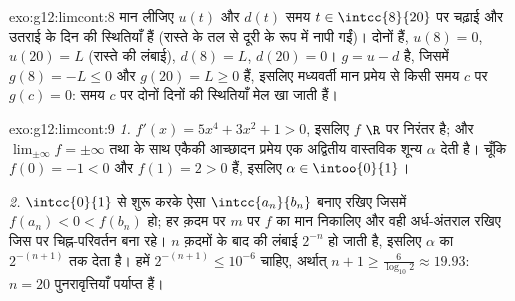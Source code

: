 \begin{solution}{exo:g12:limcont:8}
मान लीजिए $u(t)$ और $d(t)$ समय $t \in \intcc{8}{20}$ पर चढ़ाई और उतराई के दिन की स्थितियाँ हैं
(रास्ते के तल से दूरी के रूप में नापी गईं)। दोनों  हैं, $u(8) = 0$, $u(20) = L$
(रास्ते की लंबाई), $d(8) = L$, $d(20) = 0$।  $g = u - d$  है, जिसमें $g(8) = -L \leq 0$ और $g(20) = L \geq 0$ हैं,
इसलिए मध्यवर्ती मान प्रमेय से किसी समय $c$ पर $g(c) = 0$: समय $c$ पर दोनों दिनों
की स्थितियाँ मेल खा जाती हैं।
\end{solution}

\begin{solution}{exo:g12:limcont:9}
\emph{1.} $f'(x) = 5x^4 + 3x^2 + 1 > 0$, इसलिए $f$ $\R$ पर निरंतर  है; और $\lim_{\pm\infty} f = \pm\infty$ तथा 
के साथ एकैकी आच्छादन प्रमेय एक अद्वितीय वास्तविक शून्य $\alpha$ देती है। चूँकि
$f(0) = -1 < 0$ और $f(1) = 2 > 0$ हैं, इसलिए $\alpha \in \intoo{0}{1}$।

\emph{2.} $\intcc{0}{1}$ से शुरू करके ऐसा  $\intcc{a_n}{b_n}$ बनाए रखिए जिसमें $f(a_n) < 0 < f(b_n)$ हो; हर
क़दम पर  $m$ पर $f$ का मान निकालिए और वही अर्ध-अंतराल रखिए जिस
पर चिह्न-परिवर्तन बना रहे। $n$ क़दमों के बाद  की लंबाई $2^{-n}$ हो जाती
है, इसलिए  $\alpha$ का $2^{-(n+1)}$ तक  देता है। हमें $2^{-(n+1)} \leq 10^{-6}$ चाहिए,
अर्थात् $n + 1 \geq \frac{6}{\log_{10} 2} \approx 19.93$: $n = 20$ पुनरावृत्तियाँ पर्याप्त हैं।
\end{solution}

